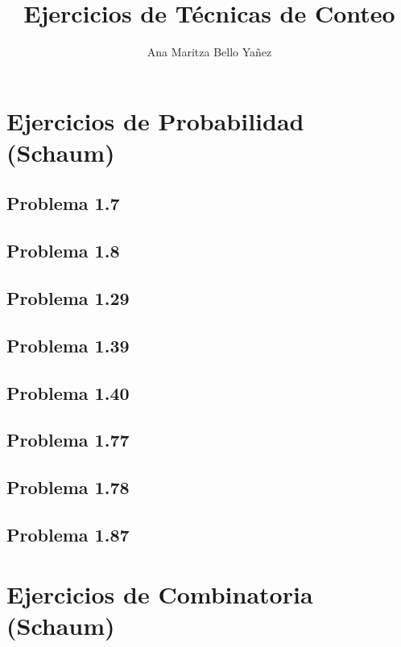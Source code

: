 \documentclass[12pt]{article}
\begin{document}
\title{Ejercicios de Técnicas de Conteo}
\author{Ana Maritza Bello Ya\~nez}
\maketitle
\setlength{\parindent}{0pt}
\setlength{\parskip}{1em}

\section*{Ejercicios de Probabilidad (Schaum)}

\subsection*{Problema 1.7}

\subsection*{Problema 1.8}

\subsection*{Problema 1.29}

\subsection*{Problema 1.39}

\subsection*{Problema 1.40}

\subsection*{Problema 1.77}

\subsection*{Problema 1.78}

\subsection*{Problema 1.87}

\section*{Ejercicios de Combinatoria (Schaum)}
\end{document}
